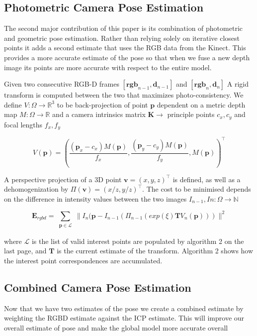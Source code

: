 \documentclass[10pt, twocolumn]{article}
\begin{document}
\subsection{Photometric Camera Pose Estimation}
The second major contribution of this paper is its combination of photometric and geometric pose estimation. Rather than relying solely on iterative closest points it adds a second estimate that uses the RGB data from the Kinect. This provides a more accurate estimate of the pose so that when we fuse a new depth image its points are more accurate with respect to the entire model.

Given two consecutive RGB-D frames $[\mathbf{rgb}_{n-1}, \mathbf{d}_{n-1}]$ and $[\mathbf{rgb}_{n}, \mathbf{d}_{n}]$
A rigid transform is computed between the two that maximizes photo-consistency. 
We define $V: \Omega \rightarrow \mathbb{R}^{3}$ to be back-projection of point $\mathbf{p}$ dependent on
a metric depth map $M: \Omega \rightarrow \mathbb{R}$ and
a camera intrinsics matrix $\mathbf{K} \rightarrow$ principle points $c_{x}, c_{y}$ and focal lengths $f_{x}, f_{y}$ 

\begin{equation}
V(\mathbf{p}) = \left( \frac{(\mathbf{p}_{x} - c_{x})M(\mathbf{p})}{f_{x}}, \frac{(\mathbf{p}_{y} - c_{y})M(\mathbf{p})}{f_{y}}, M(\mathbf{p}) \right)^{\top}
\end{equation}

A perspective projection of a 3D point $\mathbf{v} = (x,y,z)^{\top}$ is defined, as well as a dehomogenization by $\Pi(\mathbf{v}) = (x/z, y/z)^{\top}$. The cost to be minimised depends on the difference in intensity values between the two images $I_{n-1}, I{n}: \Omega \rightarrow \mathbb{N}$

\begin{equation}
\mathbf{E}_{rgbd} = 
\sum_{\substack{
   \mathbf{p} \in \mathcal{L} 
  }}
  \| I_{n}(\mathbf{p} - I_{n-1}(\Pi_{n-1}(exp(\xi)\mathbf{T}V_{n}(\mathbf{p})))  \|^{2}
\end{equation}

where $\mathcal{L}$ is the list of valid interest points are populated by algorithm 2 on the last page, and $\mathbf{T}$ is the current estimate of the transform. Algorithm 2 shows how the interest point correspondences are accumulated.




\subsection{Combined Camera Pose Estimation}
Now that we have two estimates of the pose we create a combined estimate by weighting the RGBD estimate against the ICP estimate. This will improve our overall estimate of pose and make the global model more accurate overall
\end{document}
